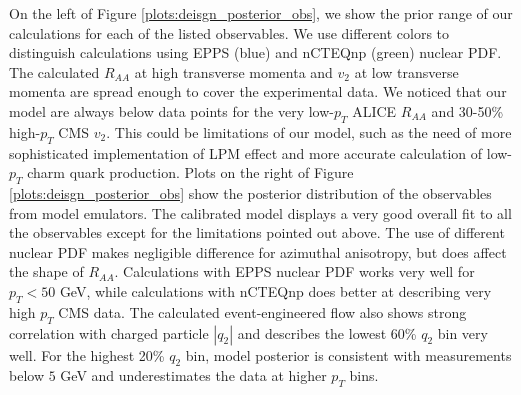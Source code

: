 \documentclass[aps, prc, reprint, amsmath, groupedaddress, nofootinbib]{revtex4-1}
\begin{document}
On the left of Figure \ref{plots:deisgn_posterior_obs}, we show the prior range of our calculations for each of the listed observables. 
We use different colors to distinguish calculations using EPPS (blue) and
nCTEQnp (green) nuclear PDF.
The calculated $R_{AA}$ at high transverse momenta and $v_2$ at low transverse momenta are spread enough to cover the experimental data.
We noticed that our model are always below data points for the very low-$p_T$ ALICE $R_{AA}$ and 30-50\% high-$p_T$ CMS $v_2$.
This could be limitations of our model, such as the need of more sophisticated implementation of LPM effect and more accurate calculation of low-$p_T$ charm quark production. 
Plots on the right of Figure \ref{plots:deisgn_posterior_obs} show the posterior distribution of the observables from model emulators.
The calibrated model displays a very good overall fit to all the observables except for the limitations pointed out above.
The use of different nuclear PDF makes negligible difference for azimuthal anisotropy, but does affect the shape of $R_{AA}$.
Calculations with EPPS nuclear PDF works very well for $p_T < 50$ GeV, while calculations with nCTEQnp does better at describing very high $p_T$ CMS data.
The calculated event-engineered flow also shows strong correlation with charged particle $|q_2|$ and describes the lowest 60\% $q_2$ bin very well.
For the highest 20\% $q_2$ bin, model posterior is consistent with measurements below $5$ GeV and underestimates the data at higher $p_T$ bins.
\end{document}
